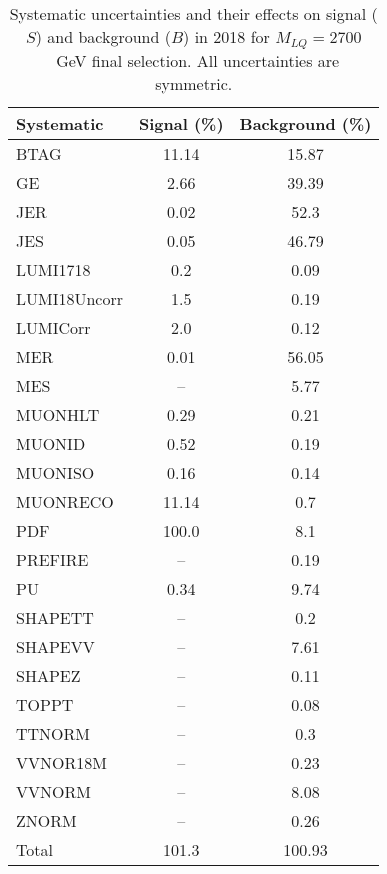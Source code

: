 \begin{table}[htbp]
\begin{center}
\caption{Systematic uncertainties and their effects on signal ($S$) and background ($B$) in 2018 for $M_{LQ}=2700$~GeV final selection. All uncertainties are symmetric.}
\begin{tabular}{lcc}
\hline\hline
Systematic & Signal (\%) & Background (\%) \\ \hline 
BTAG & 11.14 & 15.87\\ 
GE & 2.66 & 39.39\\ 
JER & 0.02 & 52.3\\ 
JES & 0.05 & 46.79\\ 
LUMI1718 & 0.2 & 0.09\\ 
LUMI18Uncorr & 1.5 & 0.19\\ 
LUMICorr & 2.0 & 0.12\\ 
MER & 0.01 & 56.05\\ 
MES & -- & 5.77\\ 
MUONHLT & 0.29 & 0.21\\ 
MUONID & 0.52 & 0.19\\ 
MUONISO & 0.16 & 0.14\\ 
MUONRECO & 11.14 & 0.7\\ 
PDF & 100.0 & 8.1\\ 
PREFIRE & -- & 0.19\\ 
PU & 0.34 & 9.74\\ 
SHAPETT & -- & 0.2\\ 
SHAPEVV & -- & 7.61\\ 
SHAPEZ & -- & 0.11\\ 
TOPPT & -- & 0.08\\ 
TTNORM & -- & 0.3\\ 
VVNOR18M & -- & 0.23\\ 
VVNORM & -- & 8.08\\ 
ZNORM & -- & 0.26\\ 
Total & 101.3 & 100.93\\ \hline \hline
\end{tabular}
\label{tab:SysUncertainties_uujj_2700}
\end{center}
\end{table}

